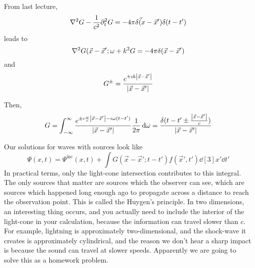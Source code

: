 \documentclass[a4paper,twoside,master.tex]{subfiles}
\begin{document}

From last lecture,
\begin{equation}
    \laplacian{G} - \frac{1}{c^2} \partial_t^2 G = -4 \pi \vec{\delta(x} - \vec{x}') \delta(t - t')
\end{equation}
leads to
\begin{equation}
    \laplacian{G( \vec{x} - \vec{x}'; \omega} + k^2 G = - 4 \pi \delta( \vec{x} - \vec{x}')
\end{equation}
and
\begin{equation}
    G^{\pm} = \frac{e^{\pm \imath k \abs{ \vec{x} - \vec{x}'}}}{\abs{ \vec{x} - \vec{x}'}}
\end{equation}

Then,
\begin{equation}
    G = \int_{- \infty}^{\infty} \frac{e^{\pm \imath \frac{\omega}{c} \abs{ \vec{x} - \vec{x}'} - \imath\omega(t-t') }}{\abs{ \vec{x} - \vec{x}'}} \frac{1}{2 \pi} \dd{\omega} = \frac{\delta(t-t' \pm \frac{\abs{ \vec{x} - \vec{x}'}}{c})}{\abs{ \vec{x} - \vec{x}'}}
\end{equation}

Our solutions for waves with sources look like
\begin{equation}
    \Psi(x,t) = \Psi^{\text{inc}}(x,t) + \int G( \vec{x} - \vec{x}'; t-t') f( \vec{x}', t') \dd[3]{x'} \dd{t'}
\end{equation}
In practical terms, only the light-cone intersection contributes to this integral. The only sources that matter are sources which the observer can see, which are sources which happened long enough ago to propagate across a distance to reach the observation point. This is called the Huygen's principle. In two dimensions, an interesting thing occurs, and you actually need to include the interior of the light-cone in your calculation, because the information can travel slower than $ c $. For example, lightning is approximately two-dimensional, and the shock-wave it creates is approximately cylindrical, and the reason we don't hear a sharp impact is because the sound can travel at slower speeds. Apparently we are going to solve this as a homework problem.
\end{document}
